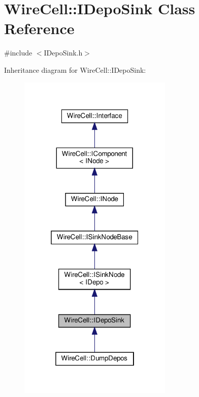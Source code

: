 \hypertarget{class_wire_cell_1_1_i_depo_sink}{}\section{Wire\+Cell\+:\+:I\+Depo\+Sink Class Reference}
\label{class_wire_cell_1_1_i_depo_sink}


{\ttfamily \#include $<$I\+Depo\+Sink.\+h$>$}



Inheritance diagram for Wire\+Cell\+:\+:I\+Depo\+Sink\+:
\nopagebreak
\begin{figure}[H]
\begin{center}
\leavevmode
\includegraphics[width=208pt]{class_wire_cell_1_1_i_depo_sink__inherit__graph}
\end{center}
\end{figure}


